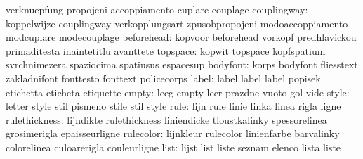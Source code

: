                            verknuepfung              propojeni
                           accoppiamento             cuplare
                           couplage
              couplingway: koppelwijze               couplingway
                           verkopplungsart           zpusobpropojeni
                           modoaccoppiamento         modcuplare
                           modecouplage
               beforehead: kopvoor                   beforehead
                           vorkopf                   predhlavickou
                           primaditesta              inaintetitlu
                           avanttete
                 topspace: kopwit                    topspace
                           kopfspatium               svrchnimezera
                           spaziocima                spatiusus
                           espacesup
                 bodyfont: korps                     bodyfont
                           fliesstext                zakladnifont
                           fonttesto                 fonttext
                           policecorps
                    label: label                     label
                           label                     popisek
                           etichetta                 eticheta
                           etiquette
                    empty: leeg                      empty
                           leer                      prazdne
                           vuoto                     gol
                           vide
                    style: letter                    style
                           stil                      pismeno
                           stile                     stil
                           style
                     rule: lijn                      rule
                           linie                     linka
                           linea                     rigla
                           ligne
            rulethickness: lijndikte                 rulethickness
                           liniendicke               tloustkalinky
                           spessorelinea             grosimerigla
                           epaisseurligne
                rulecolor: lijnkleur                 rulecolor
                           linienfarbe               barvalinky
                           colorelinea               culoarerigla
                           couleurligne
                     list: lijst                     list
                           liste                     seznam
                           elenco                    lista
                           liste
